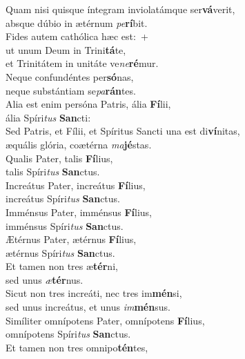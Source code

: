 \evenverse Quam nisi quisque íntegram inviolatámque ser\textbf{vá}verit,~\*\\
\evenverse absque dúbio in ætérnum \textit{pe}\textbf{rí}bit.\\
\oddverse Fides autem cathólica hæc est:~+\\
\oddverse  ut unum Deum in Trini\textbf{tá}te,~\*\\
\oddverse et Trinitátem in unitáte ve\textit{ne}\textbf{ré}mur.\\
\evenverse Neque confundéntes per\textbf{só}nas,~\*\\
\evenverse neque substántiam se\textit{pa}\textbf{rán}tes.\\
\oddverse Alia est enim persóna Patris, ália \textbf{Fí}lii,~\*\\
\oddverse ália Spíri\textit{tus} \textbf{San}cti:\\
\evenverse Sed Patris, et Fílii, et Spíritus Sancti una est di\textbf{ví}nitas,~\*\\
\evenverse æquális glória, coætérna \textit{ma}\textbf{jé}stas.\\
\oddverse Qualis Pater, talis \textbf{Fí}lius,~\*\\
\oddverse talis Spíri\textit{tus} \textbf{San}ctus.\\
\evenverse Increátus Pater, increátus \textbf{Fí}lius,~\*\\
\evenverse increátus Spíri\textit{tus} \textbf{San}ctus.\\
\oddverse Imménsus Pater, imménsus \textbf{Fí}lius,~\*\\
\oddverse imménsus Spíri\textit{tus} \textbf{San}ctus.\\
\evenverse Ætérnus Pater, ætérnus \textbf{Fí}lius,~\*\\
\evenverse ætérnus Spíri\textit{tus} \textbf{San}ctus.\\
\oddverse Et tamen non tres æ\textbf{tér}ni,~\*\\
\oddverse sed unus \textit{æ}\textbf{tér}nus.\\
\evenverse Sicut non tres increáti, nec tres im\textbf{mén}si,~\*\\
\evenverse sed unus increátus, et unus \textit{im}\textbf{mén}sus.\\
\oddverse Simíliter omnípotens Pater, omnípotens \textbf{Fí}lius,~\*\\
\oddverse omnípotens Spíri\textit{tus} \textbf{San}ctus.\\
\evenverse Et tamen non tres omnipo\textbf{tén}tes,~\*\\
